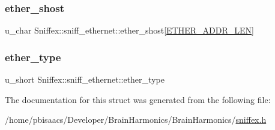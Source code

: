\mbox{\label{structSniffex_1_1sniff__ethernet_af40407403f51872c064c28298441b2d9}} 
\subsubsection{\texorpdfstring{ether\+\_\+shost}{ether\_shost}}
{\footnotesize\ttfamily u\+\_\+char Sniffex\+::sniff\+\_\+ethernet\+::ether\+\_\+shost\mbox{[}\mbox{\hyperlink{sniffex_8h_abf4fcaacb1ad2010711b7c880ec2ed20}{E\+T\+H\+E\+R\+\_\+\+A\+D\+D\+R\+\_\+\+L\+EN}}\mbox{]}}

\mbox{\label{structSniffex_1_1sniff__ethernet_a31b8a8e9232feffeeb747f949580753a}} 
\subsubsection{\texorpdfstring{ether\+\_\+type}{ether\_type}}
{\footnotesize\ttfamily u\+\_\+short Sniffex\+::sniff\+\_\+ethernet\+::ether\+\_\+type}



The documentation for this struct was generated from the following file\+:\begin{DoxyCompactItemize}
\item 
/home/pbisaacs/\+Developer/\+Brain\+Harmonics/\+Brain\+Harmonics/\mbox{\hyperlink{sniffex_8h}{sniffex.\+h}}\end{DoxyCompactItemize}
